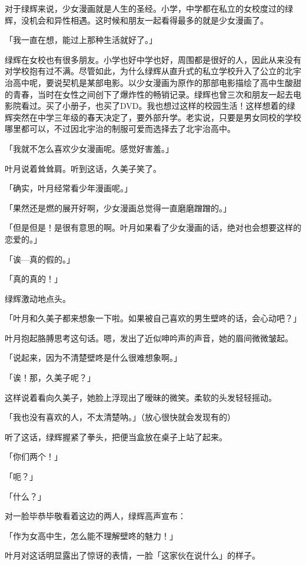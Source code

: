 \documentclass[UTF8]{ctexart}
\begin{document}
    对于绿辉来说，少女漫画就是人生的圣经。小学，中学都在私立的女校度过的绿辉，没机会和异性相遇。这时候和朋友一起看得最多的就是少女漫画了。

    「我一直在想，能过上那种生活就好了。」

    绿辉在女校也有很多朋友。小学也好中学也好，周围都是很好的人，因此从来没有对学校抱有过不满。尽管如此，为什么绿辉从直升式的私立学校升入了公立的北宇治高中呢，要说契机是某部电影。以少女漫画为原作的那部电影描绘了高中生酸甜的青春，当时在女性之间创下了爆炸性的畅销记录。绿辉也曾三次和朋友一起去电影院看过。买了小册子，也买了DVD。我也想过这样的校园生活！这样想着的绿辉突然在中学三年级的春天决定了，要外部升学。老实说，只要是男女同校的学校哪里都可以，不过因北宇治的制服可爱而选择去了北宇治高中。

    「我就不怎么喜欢少女漫画呢。感觉好害羞。」

    叶月说着耸耸肩。听到这话，久美子笑了。

    「确实，叶月经常看少年漫画呢。」

    「果然还是燃的展开好啊，少女漫画总觉得一直磨磨蹭蹭的。」

    「但是但是！是很有意思的啊。叶月如果看了少女漫画的话，绝对也会想要这样的恋爱的。」

    「诶—真的假的。」

    「真的真的！」

    绿辉激动地点头。

    「叶月和久美子都来想象一下啦。如果被自己喜欢的男生壁咚的话，会心动吧？」

    叶月抱起胳膊思考这句话。嗯，发出了近似呻吟声的声音，她的眉间微微皱起。

    「说起来，因为不清楚壁咚是什么很难想象啊。」

    「诶！那，久美子呢？」

    这样说着看向久美子，她脸上浮现出了暧昧的微笑。柔软的头发轻轻摇动。

    「我也没有喜欢的人，不太清楚呐。」（放心很快就会发现有的）

    听了这话，绿辉握紧了拳头，把便当盒放在桌子上站了起来。

    「你们两个！」

    「呃？」

    「什么？」

    对一脸毕恭毕敬看着这边的两人，绿辉高声宣布：

    「作为女高中生，怎么能不理解壁咚的魅力！」

    叶月对这话明显露出了惊讶的表情，一脸「这家伙在说什么」的样子。
\end{document}
